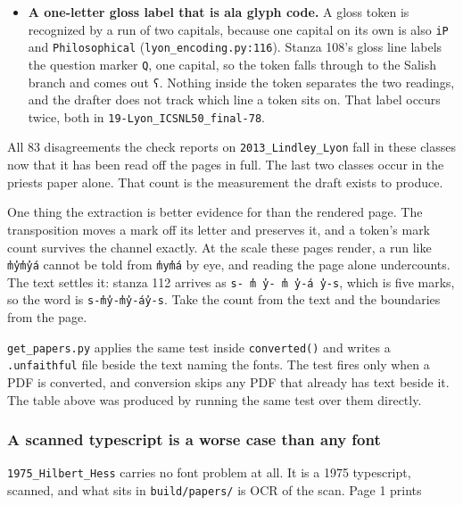 \begin{itemize}
\item \textbf{A one-letter gloss label that is ala glyph code.} A gloss token is recognized by a run of two capitals, because one capital on its own is also \texttt{i\allowbreak{}P} and \texttt{Philosophical} (\texttt{lyon\_\allowbreak{}encoding.\allowbreak{}py:116}). Stanza 108's gloss line labels the question marker \texttt{Q}, one capital, so the token falls through to the Salish branch and comes out \texttt{ʕ}. Nothing inside the token separates the two readings, and the drafter does not track which line a token sits on. That label occurs twice, both in \texttt{19-\allowbreak{}Lyon\_\allowbreak{}ICSNL50\_\allowbreak{}final-\allowbreak{}78}.
\end{itemize}

All 83 disagreements the check reports on \texttt{2013\_\allowbreak{}Lindley\_\allowbreak{}Lyon} fall in these classes now that it has been read off the pages in full. The last two classes occur in the priests paper alone. That count is the measurement the draft exists to produce.

One thing the extraction is better evidence for than the rendered page. The transposition moves a mark off its letter and preserves it, and a token's mark count survives the channel exactly. At the scale these pages render, a run like \texttt{m̓y̓m̓y̓á} cannot be told from \texttt{m̓ym̓á} by eye, and reading the page alone undercounts. The text settles it: stanza 112 arrives as \texttt{s-\allowbreak{} m̓ y̓-\allowbreak{} m̓ y̓-\allowbreak{}á y̓-\allowbreak{}s}, which is five marks, so the word is \texttt{s-\allowbreak{}m̓y̓-\allowbreak{}m̓y̓-\allowbreak{}áy̓-\allowbreak{}s}. Take the count from the text and the boundaries from the page.

\texttt{get\_\allowbreak{}papers.\allowbreak{}py} applies the same test inside \texttt{converted()} and writes a \texttt{.\allowbreak{}unfaithful} file beside the text naming the fonts. The test fires only when a PDF is converted, and conversion skips any PDF that already has text beside it. The table above was produced by running the same test over them directly.

\subsubsection{A scanned typescript is a worse case than any font}

\texttt{1975\_\allowbreak{}Hilbert\_\allowbreak{}Hess} carries no font problem at all. It is a 1975 typescript, scanned, and what sits in \texttt{build/\allowbreak{}papers/\allowbreak{}} is OCR of the scan. Page 1 prints

